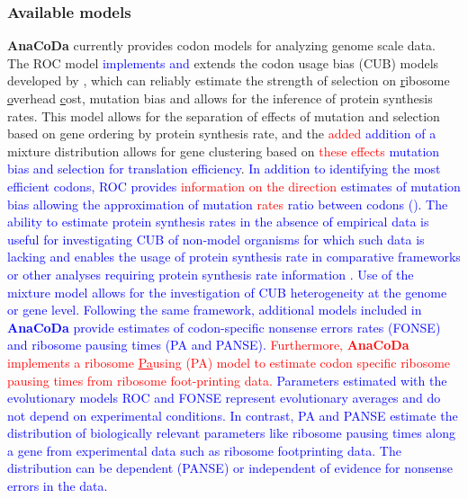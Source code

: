 \documentclass{bioinfo}
\newcommand{\package}{\textbf{AnaCoDa}\xspace} %
\begin{document}
\subsubsection*{Available models}
\package currently provides codon models for analyzing genome scale data.
The ROC model \textcolor{blue}{implements and} extends the codon usage bias (CUB) models developed by \citet{gilchrist2015,wallace2013,shah2011}, which can reliably estimate the strength of selection on \underline{r}ibosome \underline{o}verhead \underline{c}ost, mutation bias and allows for the inference of protein synthesis rates.
This model allows for the separation of effects of mutation and selection based on gene ordering by protein synthesis rate, and the \textcolor{red}{added} \textcolor{blue}{addition of a} mixture distribution allows for gene clustering based on \textcolor{red}{these effects} \textcolor{blue}{mutation bias and selection for translation efficiency}.
\textcolor{blue}{
In addition to identifying the most efficient codons, ROC provides \textcolor{red}{information on the direction} \textcolor{blue}{estimates} of mutation bias allowing the approximation of mutation \textcolor{red}{rates} \textcolor{blue}{ratio} between codons (\citet{gilchrist2015,wallace2013}).
The ability to estimate protein synthesis rates in the absence of empirical data is useful for investigating CUB of non-model organisms for which such data is lacking and enables the usage of protein synthesis rate in comparative frameworks or other analyses requiring protein synthesis rate information \citet{dunn2018}.
Use of the mixture model allows for the investigation of CUB heterogeneity at the genome or gene level.  
Following the same framework, additional models included in \package provide estimates of codon-specific nonsense errors rates (FONSE) and ribosome pausing times (PA and PANSE).
}
\textcolor{red}{
Furthermore, \package implements a ribosome \underline{Pa}using (PA) model to estimate codon specific ribosome pausing times from ribosome foot-printing data.
}
\textcolor{blue}{
Parameters estimated with the evolutionary models ROC and FONSE represent evolutionary averages and do not depend on experimental conditions. 
In contrast, PA and PANSE estimate the distribution of biologically relevant parameters like ribosome pausing times along a gene from experimental data such as ribosome footprinting data. 
The distribution can be dependent (PANSE) or independent of evidence for nonsense errors in the data.  
}



\end{document}
